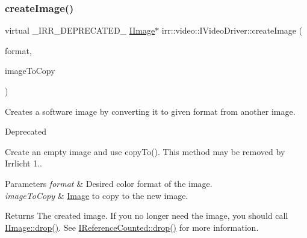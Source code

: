 \subsubsection{\texorpdfstring{create\+Image()}{createImage()}\hspace{0.1cm}{\footnotesize\ttfamily [3/8]}}
{\footnotesize\ttfamily virtual \+\_\+\+I\+R\+R\+\_\+\+D\+E\+P\+R\+E\+C\+A\+T\+E\+D\+\_\+ \hyperlink{classirr_1_1video_1_1IImage}{I\+Image}$\ast$ irr\+::video\+::\+I\+Video\+Driver\+::create\+Image (\begin{DoxyParamCaption}\item[{\hyperlink{namespaceirr_1_1video_a1d5e487888c32b1674a8f75116d829ed}{E\+C\+O\+L\+O\+R\+\_\+\+F\+O\+R\+M\+AT}}]{format,  }\item[{\hyperlink{classirr_1_1video_1_1IImage}{I\+Image} $\ast$}]{image\+To\+Copy }\end{DoxyParamCaption})\hspace{0.3cm}{\ttfamily [pure virtual]}}



Creates a software image by converting it to given format from another image. 

\begin{DoxyRefDesc}{Deprecated}
\item[\hyperlink{deprecated__deprecated000023}{Deprecated}]Create an empty image and use copy\+To(). This method may be removed by Irrlicht 1.. \end{DoxyRefDesc}

\begin{DoxyParams}{Parameters}
{\em format} & Desired color format of the image. \\
\hline
{\em image\+To\+Copy} & \hyperlink{classImage}{Image} to copy to the new image. \\
\hline
\end{DoxyParams}
\begin{DoxyReturn}{Returns}
The created image. If you no longer need the image, you should call \hyperlink{classirr_1_1IReferenceCounted_a03856a09355b89d178090c4a5f738543}{I\+Image\+::drop()}. See \hyperlink{classirr_1_1IReferenceCounted_a03856a09355b89d178090c4a5f738543}{I\+Reference\+Counted\+::drop()} for more information. 
\end{DoxyReturn}
\mbox{\label{classirr_1_1video_1_1IVideoDriver_af92ef735bc8c755f5c201a52a70d05e8}} 
